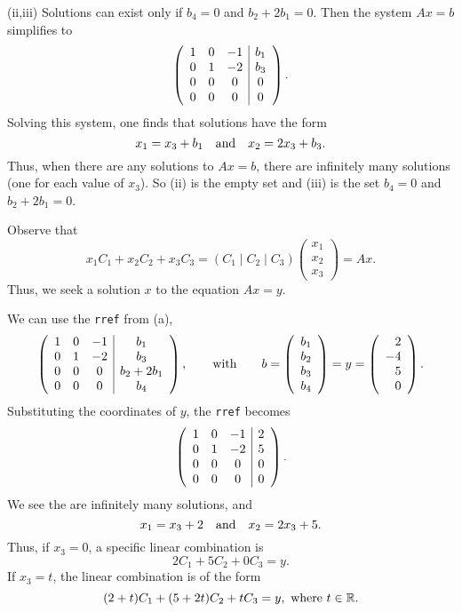 \documentclass{ximera}
\begin{document}
\begin{exercise}
\begin{solution}
\begin{enumeratea}
(ii,iii)  Solutions can exist only if  $b_4 = 0$ and $b_2 + 2b_1 = 0$. Then the system $Ax = b$  simplifies to 
\[
\left(\begin{array}{ccc|c}
1 & 0 & -1 & b_1\\  
0 & 1 & -2 & b_3 \\ 
0 & 0 & 0 & 0\\ 
0 & 0 & 0 & 0
\end{array}\right)\ldotp
\]
Solving this system, one finds that solutions have the form   
\[
x_1 = x_3 + b_1 \quad\mbox{and}\quad x_2 = 2x_3 + b_3.
\] 
Thus, when there are any solutions to $Ax=b$, there are infinitely many solutions (one for each value of $x_3$).  So (ii) is the empty set and (iii) is the set  $b_4=0$ and $b_2 + 2b_1 = 0$.

\item  Observe that 
\[
x_1C_1 + x_2C_2 + x_3C_3 = (C_1\mid C_2\mid C_3)\left(\begin{array}{c} x_1\\x_2\\x_3 \end{array}\right) = Ax. 
\]
Thus, we seek a solution $x$ to the equation $Ax=y$.  

We can use the \texttt{rref} from (a), 
\[
\left(\begin{array}{ccc|c} 
1 & 0 & -1 & b_1 \\ 
0 & 1 & -2 & b_3 \\ 
0 & 0 & 0 & b_2+2b_1 \\ 
0 & 0 & 0 & b_4
\end{array}\right), 
\qquad \text{with} \qquad
b=\left(\begin{array}{rrrrrrrrrrrrrrrrrr} b_1\\b_2\\b_3\\b_4 \end{array}\right) = y = \left(\begin{array}{rrrrrrrrrrrrrrrrrr} 2\\-4\\5 \\ 0 \end{array}\right).  
\]
Substituting the coordinates of $y$, the \texttt{rref} becomes
\[
\left(\begin{array}{ccc|c} 
1 & 0 & -1 & 2 \\ 
0 & 1 & -2 & 5 \\ 
0 & 0 & 0 & 0 \\ 
0 & 0 & 0 & 0
\end{array}\right)\ldotp
\]
We see the are infinitely many solutions, and
\[
x_1 = x_3 + 2 \quad\mbox{and}\quad x_2 = 2x_3 + 5.
\] 
Thus, if $x_3 = 0$, a specific linear combination is 
\[
2 C_1 + 5 C_2 + 0 C_3 = y. 
\]  
If $x_3=t$, the linear combination is of the form 
\[
(2+t) C_1 + (5+2t) C_2 + t C_3 = y,\text{ where } t\in\mbox{$\mathbb{R}$}.
\] 
\end{enumeratea}
\end{solution}
\end{exercise}
\end{document}
